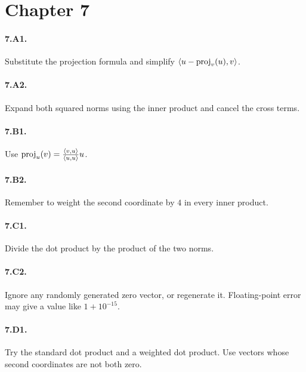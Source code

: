 \section*{Chapter 7}
\paragraph{7.A1.} Substitute the projection formula and simplify
$\left\langle u-\operatorname{proj}_v(u),v \right\rangle$.
\paragraph{7.A2.} Expand both squared norms using the inner product and cancel
the cross terms.
\paragraph{7.B1.} Use $\operatorname{proj}_u(v)=\frac{\left\langle v,u \right\rangle}{\left\langle u,u \right\rangle}u$.
\paragraph{7.B2.} Remember to weight the second coordinate by $4$ in every
inner product.
\paragraph{7.C1.} Divide the dot product by the product of the two norms.
\paragraph{7.C2.} Ignore any randomly generated zero vector, or regenerate it.
Floating-point error may give a value like $1+10^{-15}$.
\paragraph{7.D1.} Try the standard dot product and a weighted dot product.
Use vectors whose second coordinates are not both zero.
